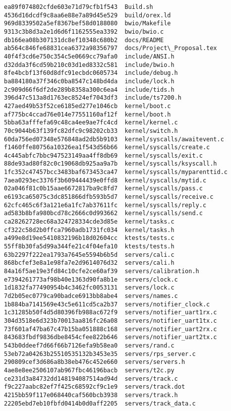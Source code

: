 \documentclass{article}
\begin{document}
\begin{verbatim}
ea89f074802cfde603e71d79cfb1f543  Build.sh
4536d16dcdf9c8aa6e88e7a89d45e529  build/orex.ld
969d8339502a5ef8367bef58d0188080  bwio/Makefile
9313c3b8d3a2e1d6d6f1162555ea3392  bwio/bwio.c
db166ea08b307131dc8ef10348c680b2  docs/README
ab564c846fe68831cea6372a98356797  docs/Project\_Proposal.tex
40f4f3cd6e750c354c5e0669cc79afa0  include/ANSI.h
d32dda3f6cd59b210c03d1ed8332c581  include/bwio.h
8fe4bcbf13f60d8dfc91ecbdc0605734  include/debug.h
ba884180a37f346c0ba8547c148bd4da  include/lock.h
2c909d66f6df2de289b8358a300c6ea4  include/tids.h
396d47c513a8d1763ec8524ef7043df3  include/ts7200.h
427aed49b53f52ce6185ed277e1046cb  kernel/boot.c
af775bc4ccad76e014e77551160af12f  kernel/boot.h
5bba63afffefa69c48ca4ee9ae7fc4cd  kernel/kernel.c
70c9044b63f139fc82dfc9c98202cb33  kernel/switch.h
60da756ed07348e576848ad2db5b9103  kernel/syscalls/awaitevent.c
f1460ffe80756a10326ea1f543d56b66  kernel/syscalls/create.c
4c445abfc7bbc947523149aa4ff8db69  kernel/syscalls/exit.c
88de93ad80f82c0c19068db925aa9a7b  kernel/syscalls/ksyscall.h
1fc352c47457bcc3483baf673453ca47  kernel/syscalls/myparenttid.c
7aea0293ec3376f3b609444439e0ffd8  kernel/syscalls/mytid.c
02a046f81c0b15aae6672817ba9c8fd7  kernel/syscalls/pass.c
e6193ca65075c3dc851866dfb593b5d7  kernel/syscalls/receive.c
62cfc465c6f3a121e6a1fc7ab37611fc  kernel/syscalls/reply.c
ad583b8bfa980bcd78c2666c0d993662  kernel/syscalls/send.c
ca28262728ec68a324728334cde3d85e  kernel/tasks.c
cf322c58d2b0ffca7960adb1731fc034  kernel/tasks.h
a499e8d19ee5410832196b18d02604cc  ktests/tests.c
55ff8b30fa5d99a344fe21c4f04efa10  ktests/tests.h
63b2297f222ea1793a7645e5594b6b5d  servers/cali.c
868bcfef3e8a1e98fa7e2d9614076d32  servers/cali.h
84a16f5ae19e3fd84c10cfe2ce60af39  servers/calibration.h
e7394261773af98b40e1363d90fa8b1e  servers/clock.c
1d1832fa77490954b4c3462fc0053131  servers/lock.c
7d2b05ec0779ca90badce6913bb8abe4  servers/names.c
1b884ba7141569e43c5e611cd5ca2b37  servers/notifier_clock.c
1c31285b50f4d5d80396fb988ac672f9  servers/notifier_uart1rx.c
304d3518e6d323b70013aa816fc26a08  servers/notifier_uart1tx.c
73f601af47ba67c47b15ba051888c168  servers/notifier_uart2rx.c
843683fbdf9836dbe8454cfee822b646  servers/notifier_uart2tx.c
543b0ddeef7d66f66b7126efa9b58ea0  servers/rand.c
53eb72a04263b25510535132b3453e35  servers/rps_server.c
290809cef3d686a8b38eb476c452e660  servers/servers.h
4ae8e8ee2506107ab967fbc46196bacb  servers/t2c.py
ce231d3a84732dd148194087514ad94d  servers/track.c
f9c227aabc82ef7f425c68592cf9c1e9  servers/track.dot
4215bb59f117e068440caf560bcb3938  servers/track.h
22205ebd7eb10fbfd0414b0d0aff2205  servers/track_data.c

\end{verbatim}
\end{document}
